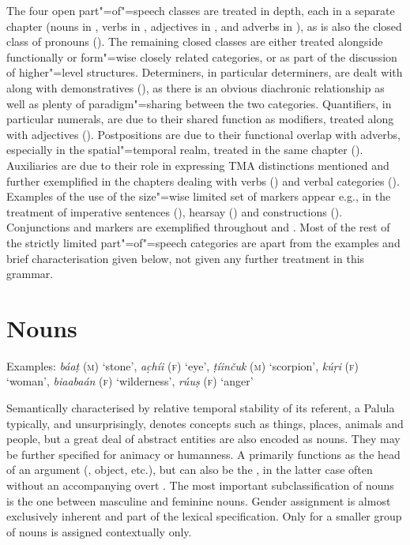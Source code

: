 The four open part"=of"=speech classes are treated in depth, each in a separate chapter (nouns in , verbs in , adjectives in , and adverbs in ), as is also the closed class of pronouns (). The remaining closed classes are either treated alongside functionally or form"=wise closely related categories, or as part of the discussion of higher"=level structures. Determiners, in particular  determiners, are dealt with along with  demonstratives (), as there is an obvious diachronic relationship as well as plenty of paradigm"=sharing between the two categories. Quantifiers, in particular numerals, are due to their shared function as  modifiers, treated along with adjectives (). Postpositions are due to their functional overlap with adverbs, especially in the spatial"=temporal realm, treated in the same chapter (). Auxiliaries are due to their role in expressing TMA distinctions mentioned and further exemplified in the chapters dealing with verbs () and verbal categories (). Examples of the use of the size"=wise limited set of  markers appear e.g., in the treatment of imperative sentences (), hearsay () and  constructions (). Conjunctions and  markers are exemplified throughout  and . Most of the rest of the strictly limited part"=of"=speech categories are apart from the examples and brief characterisation given below, not given any further treatment in this grammar.


\section{Nouns}
\label{sec:3b-2}
 
Examples: \textit{báaṭ} (\textsc{m}) `stone', \textit{ac̣híi} (\textsc{f}) `eye', \textit{ṭíinčuk} (\textsc{m}) `scorpion', \textit{kúṛi} (\textsc{f}) `woman',  \textit{biaabaán} (\textsc{f}) `wilderness', \textit{rúuṣ} (\textsc{f}) `anger'


Semantically characterised by relative temporal stability of its referent, a Palula  typically, and unsurprisingly, denotes concepts such as things, places, animals and people, but a great deal of abstract entities are also encoded as nouns. They may be further specified for animacy or humanness. A  primarily functions as the head of an argument (, object, etc.), but can also be the , in the latter case often without an accompanying overt . The most important subclassification of nouns is the one between masculine and feminine  nouns. Gender assignment is almost exclusively inherent and part of the lexical specification. Only for a smaller group of nouns is  assigned contextually only.


